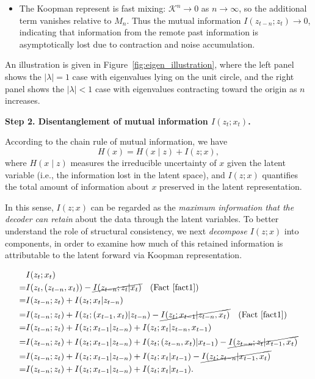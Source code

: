 \documentclass{article} %
\begin{document}
\begin{proofwithframe}
\begin{itemize}
    \item[$|\lambda|<1$:] The Koopman represent is fast mixing: $\mathcal{K}^n \to 0$ as $n \to \infty$, so the additional term 
    vanishes relative to $M_n$. Thus the mutual information $I(z_{t-n};z_t) \to 0$, indicating that information from the remote past information is asymptotically lost due to contraction and noise accumulation.
\end{itemize}
An illustration is given in Figure~\ref{fig:eigen_illustration}, where the left panel shows the $|\lambda|=1$ case with eigenvalues lying on the unit circle, and the right panel shows the $|\lambda|<1$ case with eigenvalues contracting toward the origin as $n$ increases.

\textbf{Step 2. Disentanglement of mutual information $I(z_t; x_t)$.} 

According to the chain rule of mutual information, we have
\begin{equation}
    H(x) = H(x \mid z) + I(z;x),
\end{equation}
where $H(x \mid z)$ measures the irreducible uncertainty of $x$ given the latent variable (i.e., the information lost in the latent space), and $I(z;x)$ quantifies the total amount of information about $x$ preserved in the latent representation. 

In this sense, $I(z;x)$ can be regarded as the \emph{maximum information that the decoder can retain} about the data through the latent variables. To better understand the role of structural consistency, we next \emph{decompose $I(z;x)$} into components, in order to examine how much of this retained information is attributable to the latent forward via Koopman representation.


\begin{equation} \label{eq:infor_disentanglement}
\begin{aligned}
    & I(z_t; x_t) \\
    =& I(z_t, (z_{t-n}, x_t)) - \cancel{I(z_{t-n}; z_t | x_t)} \quad \text{(Fact~\ref{fact1})} \\
    =& I(z_{t-n}; z_t) + I(z_t; x_t | z_{t-n}) \\
    =& I(z_{t-n}; z_t) + I(z_t; (x_{t-1}, x_t) | z_{t-n}) - \cancel{I(z_t; x_{t-1}| z_{t-n}, x_t)} \quad \text{(Fact~\ref{fact1})}\\
    =& I(z_{t-n}; z_t) + I(z_t; x_{t-1} | z_{t-n}) + I(z_t; x_t| z_{t-n}, x_{t-1}) \\
    =& I(z_{t-n}; z_t) + I(z_t; x_{t-1} | z_{t-n}) + I(z_t; (z_{t-n}, x_t)|x_{t-1}) - \cancel{I(z_{t-n}; z_t|x_{t-1}, x_t)} \\
    =& I(z_{t-n}; z_t) + I(z_t; x_{t-1} | z_{t-n}) + I(z_t; x_t | x_{t-1}) - \cancel{I(z_t; z_{t-n}|x_{t-1},x_t)}  \\
    =& I(z_{t-n}; z_t) + I(z_t; x_{t-1} | z_{t-n}) +  I(z_t; x_t | x_{t-1}). 
\end{aligned}
\end{equation}


\end{proofwithframe}
\end{document}
